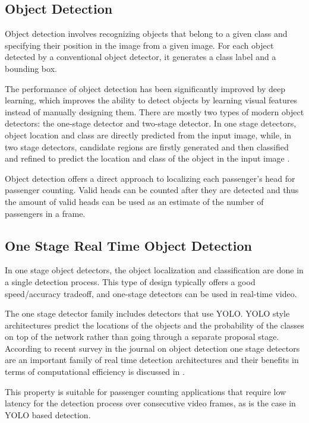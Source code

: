 \subsection{Object Detection}

Object detection involves recognizing objects that belong to a given class and specifying their position in the image from a given image. For each object detected by a conventional object detector, it generates a class label and a bounding box.

The performance of object detection has been significantly improved by deep learning, which improves the ability to detect objects by learning visual features instead of manually designing them. There are mostly two types of modern object detectors: the one-stage detector and two-stage detector. In one stage detectors, object location and class are directly predicted from the input image, while, in two stage detectors, candidate regions are firstly generated and then classified and refined to predict the location and class of the object in the input image \cite{zhao2022object}.

Object detection offers a direct approach to localizing each passenger's head for passenger counting. Valid heads can be counted after they are detected and thus the amount of valid heads can be used as an estimate of the number of passengers in a frame.

\subsection{One Stage Real Time Object Detection}

In one stage object detectors, the object localization and classification are done in a single detection process. This type of design typically offers a good speed/accuracy tradeoff, and one-stage detectors can be used in real-time video.

The one stage detector family includes detectors that use YOLO. YOLO style architectures predict the locations of the objects and the probability of the classes on top of the network rather than going through a separate proposal stage. According to recent survey in the journal on object detection one stage detectors are an important family of real time detection architectures and their benefits in terms of computational efficiency is discussed in \cite{arkin2023survey}.

This property is suitable for passenger counting applications that require low latency for the detection process over consecutive video frames, as is the case in YOLO based detection.

